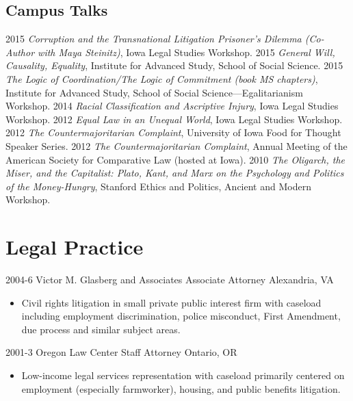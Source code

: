 \documentclass[letterpaper]{moderncv}
\begin{document}
\subsection{Campus Talks}
\cvitem
{2015}
{\textit{Corruption and the Transnational Litigation Prisoner's Dilemma (Co-Author with Maya Steinitz)}, Iowa Legal Studies Workshop.}
\vspace{1mm}
\cvitem
{2015}
{\textit{General Will, Causality, Equality}, Institute for Advanced Study, School of Social Science.}
\vspace{1mm}
\cvitem
{2015}
{\textit{The Logic of Coordination/The Logic of Commitment (book MS chapters)}, Institute for Advanced Study, School of Social Science---Egalitarianism Workshop.}
\vspace{1mm}
\cvitem
{2014}
{\textit{Racial Classification and Ascriptive Injury}, Iowa Legal Studies Workshop.}
\vspace{1mm}
\cvitem
{2012}
{\textit{Equal Law in an Unequal World}, Iowa Legal Studies Workshop.}
\vspace{1mm}
\cvitem
{2012}
{\textit{The Countermajoritarian Complaint}, University of Iowa Food for Thought Speaker Series.}
\vspace{1mm}
\cvitem
{2012}
{\textit{The Countermajoritarian Complaint}, Annual Meeting of the American Society for Comparative Law (hosted at Iowa).}
\vspace{1mm}
\cvitem
{2010}
{\textit{The Oligarch, the Miser, and the Capitalist: Plato, Kant, and Marx on the Psychology and Politics of the Money-Hungry}, Stanford Ethics and Politics, Ancient and Modern Workshop.}
\vspace{1mm}

\section{Legal Practice}

\cventry
{2004-6}
{Victor M. Glasberg and Associates}
{Associate Attorney}
{Alexandria, VA}
{}
{\begin{itemize}%
	\item Civil rights litigation in small private public interest firm with caseload including employment discrimination,
    police misconduct, First Amendment, due process and similar subject areas.
	\end{itemize}}

\cventry
{2001-3}
{Oregon Law Center}
{Staff Attorney}
{Ontario, OR}
{}
{\begin{itemize}%
	\item Low-income legal services representation with caseload primarily centered on employment
    (especially farmworker), housing, and public benefits litigation.
	\end{itemize}}
\end{document}
